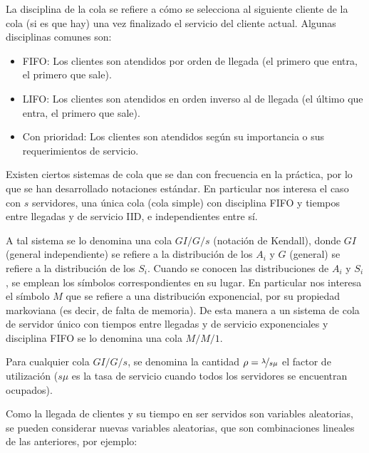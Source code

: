 La disciplina de la cola se refiere a cómo se selecciona al siguiente cliente de la cola (si es que hay) una vez finalizado el servicio del cliente actual. Algunas disciplinas comunes son:
\begin{itemize}
  \item FIFO: Los clientes son atendidos por orden de llegada (el primero que entra, el primero que sale).
  \item LIFO: Los clientes son atendidos en orden inverso al de llegada (el último que entra, el primero que sale).
  \item Con prioridad: Los clientes son atendidos según su importancia o sus requerimientos de servicio.
\end{itemize}

Existen ciertos sistemas de cola que se dan con frecuencia en la práctica, por lo que se han desarrollado notaciones estándar. En particular nos interesa el caso con $s$ servidores, una única cola (cola simple) con disciplina FIFO y tiempos entre llegadas y de servicio IID, e independientes entre sí.

A tal sistema se lo denomina una cola $GI/G/s$ (notación de Kendall), donde $GI$ (general independiente) se refiere a la distribución de los $A_{i}$ y $G$ (general) se refiere a la distribución de los $S_{i}$. Cuando se conocen las distribuciones de $A_{i}$ y $S_{i}$, se emplean los símbolos correspondientes en su lugar. En particular nos interesa el símbolo $M$ que se refiere a una distribución exponencial, por su propiedad markoviana (es decir, de falta de memoria). De esta manera a un sistema de cola de servidor único con tiempos entre llegadas y de servicio exponenciales y disciplina FIFO se lo denomina una cola $M/M/1$.

Para cualquier cola $GI/G/s$, se denomina la cantidad $\rho = \nicefrac{\lambda}{s\mu}$ el factor de utilización ($s\mu$ es la tasa de servicio cuando todos los servidores se encuentran ocupados).

Como la llegada de clientes y su tiempo en ser servidos son variables aleatorias, se pueden considerar
nuevas variables aleatorias, que son combinaciones lineales de las anteriores, por ejemplo:

